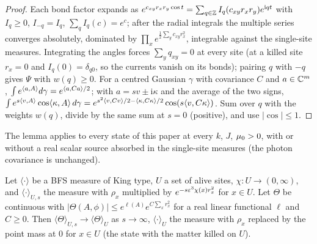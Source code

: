 \begin{proof}
Each bond factor expands as $e^{c_{xy}r_xr_y\cos t}=\sum_{q\in\mathbb Z}I_q(c_{xy}r_xr_y)e^{\mathrm iqt}$ with $I_q\ge0$, $I_{-q}=I_q$, $\sum_qI_q(c)=e^c$; after the radial integrals the multiple series converges absolutely, dominated by $\prod_xe^{\frac12\sum_yc_{xy}r_x^2}$, integrable against the single-site measures. Integrating the angles forces $\sum_yq_{xy}=0$ at every site (at a killed site $r_x=0$ and $I_q(0)=\delta_{q0}$, so the currents vanish on its bonds); pairing $q$ with $-q$ gives $\Psi$ with $w(q)\ge0$. For a centred Gaussian $\gamma$ with covariance $C$ and $a\in\mathbb C^m$, $\int e^{\langle a,A\rangle}d\gamma=e^{\langle a,Ca\rangle/2}$; with $a=sv\pm\mathrm i\kappa$ and the average of the two signs, $\int e^{s\langle v,A\rangle}\cos\langle \kappa,A\rangle\,d\gamma=e^{s^2\langle v,Cv\rangle/2-\langle \kappa,C\kappa\rangle/2}\cos(s\langle v,C\kappa\rangle)$. Sum over $q$ with the weights $w(q)$, divide by the same sum at $s=0$ (positive), and use $|\cos|\le1$.
\end{proof}

The lemma applies to every state of this paper at every $k$, $J$, $\mu_0>0$, with or without a real scalar source absorbed in the single-site measures (the photon covariance is unchanged).

\begin{lemma}[killing]\label{lem:s02:Kprime}
Let $\langle\cdot\rangle$ be a BFS measure of King type, $U$ a set of alive sites, $\chi:U\to(0,\infty)$, and $\langle\cdot\rangle_{U,s}$ the measure with $\rho_x$ multiplied by $e^{-s\varepsilon^3\chi(x)r_x^2}$ for $x\in U$. Let $\Theta$ be continuous with $|\Theta(A,\phi)|\le e^{\ell(A)}e^{C\sum_xr_x^2}$ for a real linear functional $\ell$ and $C\ge0$. Then $\langle\Theta\rangle_{U,s}\to\langle\Theta\rangle_U$ as $s\to\infty$, $\langle\cdot\rangle_U$ the measure with $\rho_x$ replaced by the point mass at $0$ for $x\in U$ (the state with the matter killed on $U$).
\end{lemma}

